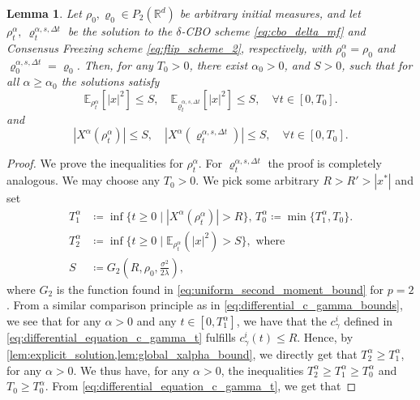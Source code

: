 \documentclass[reqno]{amsart}
\numberwithin{algorithm}{section}
\newcommand{\RR}{\mathbb{R}}
\newcommand{\EE}{{\mathbb E}}
\newcommand{\Xalpha}{{X^\alpha}}
\newtheorem{lemma}[theorem]{Lemma}
\begin{document}
{    \begin{lemma}\label{lem:local_bound}
    Let $\rho_0,\varrho_0 \in P_2(\RR^d)$ be arbitrary initial measures, and let $\rho_t^\alpha, \ \varrho^{\alpha,s,\Delta t}_t$ be the solution to the $\delta$-CBO scheme \eqref{eq:cbo_delta_mf} and Consensus Freezing scheme \eqref{eq:flip_scheme_2}, respectively, with $\rho_0^\alpha = \rho_0$ and $ \varrho^{\alpha,s,\Delta t}_0 = \varrho_0$. Then, for any $T_0 > 0$, there exist $\alpha_0 > 0$, and $S > 0$, such that for all $\alpha \geq \alpha_0$ the solutions satisfy
        \begin{equation}\label{eq:local_second_moment_bound}
        \EE_{\rho_t^\alpha} \left[ |x|^2 \right] \leq S,\quad \EE_{\varrho_t^{\alpha,s,\Delta t}} \left[ |x|^2 \right] \leq S, \quad \forall t \in [0, T_0].
    \end{equation}
    and
    \begin{equation}\label{eq:local_gamma_t_alpha_bound}
        |\Xalpha(\rho_t^\alpha)| \leq S,\quad |\Xalpha(\varrho_t^{\alpha,s,\Delta t})| \leq S, \quad \forall t \in [0, T_0].
    \end{equation}
    \end{lemma}
    \begin{proof}We prove the inequalities for $\rho^\alpha_t.$ For $\varrho^{\alpha,s,\Delta t}_t$ the proof is completely analogous.
    We may choose  any $T_0 > 0$. We pick some arbitrary $R > R' > |x^\ast|$ and set
    \begin{align*}
        T_1^\alpha &\coloneqq \inf \{ t \geq 0 \mid |\Xalpha(\rho^\alpha_t)| > R \},\, T_0^\alpha \coloneqq \min\{T_1^\alpha, T_0\}. \\
        T_2^\alpha &\coloneqq \inf \{t \geq 0 \mid \EE_{\rho^\alpha_t}(|x|^2) > S\}, \text{ where } \\
        S &{\coloneqq G_2(R, \rho_0, \frac{\sigma^2}{2\lambda})},
    \end{align*}
    where $G_2$ is the function found in \cref{eq:uniform_second_moment_bound} for $p=2$.
    From a similar comparison principle as in \cref{eq:differential_c_gamma_bounds}, we see that for any $\alpha > 0$ and any $t \in [0, T_1^\alpha]$, we have that the $c_\gamma^i$ defined in \cref{eq:differential_equation_c_gamma_t} fulfills $c_\gamma^i(t) \leq R$. Hence, by \cref{lem:explicit_solution,lem:global_xalpha_bound}, we directly get that $T_2^\alpha \geq T_1^\alpha$, for any $\alpha > 0$. We thus have, for any $\alpha > 0$, the inequalities $T_2^\alpha \geq T_1^\alpha  \geq T_0^\alpha$ and $T_0 \geq T_0^\alpha$. From \cref{eq:differential_equation_c_gamma_t}, we get that

\end{proof}}
\end{document}
